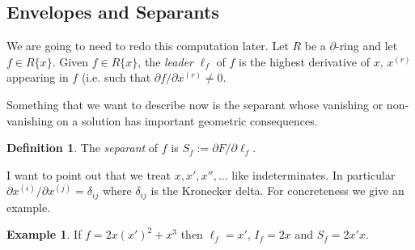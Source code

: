 \documentclass[12pt]{book}
\numberwithin{equation}{section}
\theoremstyle{definition}
\newtheorem{definition}[theorem]{Definition}
\newtheorem{example}[theorem]{Example}
\theoremstyle{remark}
\begin{document}
\subsection{Envelopes and Separants}
We are going to need to redo this computation later.
Let $R$ be a $\partial$-ring and let $f \in R\lbrace x \rbrace$. 
Given $f \in R\lbrace x \rbrace$, the \emph{leader} $\ell_f$ of $f$ is the highest derivative of $x$, $x^{(r)}$ appearing in $f$ (i.e. such that $\partial f/\partial x^{(r)} \neq 0$. 

Something that we want to describe now is the separant whose vanishing or non-vanishing on a solution has important geometric consequences.

\begin{definition}
	The \emph{separant} of $f$ is $S_f:=\partial F/\partial \ell_f$. 
\end{definition}

I want to point out that we treat $x,x',x'',\ldots$ like indeterminates. 
In particular $\partial x^{(i)}/\partial x^{(j)} = \delta_{ij}$ where $\delta_{ij}$ is the Kronecker delta. 
For concreteness we give an example.
\begin{example}
	If $f = 2x(x')^2 + x^3$ then $\ell_f = x'$, $I_f = 2x$ and $S_f = 2x'x$. 
\end{example}
\end{document}

